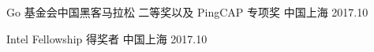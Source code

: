 
\begin{cvhonors}

  \cvhonor
    {Go 基金会中国黑客⻢拉松} %
    {二等奖以及 PingCAP 专项奖} %
    {中国上海} %
    {2017.10} %

  \cvhonor
    {Intel Fellowship} %
    {得奖者} %
    {中国上海} %
    {2017.10} %
\end{cvhonors}
